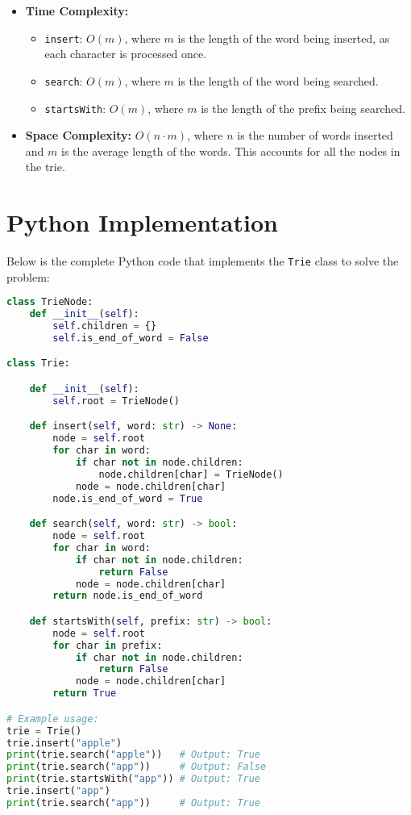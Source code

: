 \begin{itemize}
    \item \textbf{Time Complexity:}
    \begin{itemize}
        \item \texttt{insert}: \(O(m)\), where \(m\) is the length of the word being inserted, as each character is processed once.
        \item \texttt{search}: \(O(m)\), where \(m\) is the length of the word being searched.
        \item \texttt{startsWith}: \(O(m)\), where \(m\) is the length of the prefix being searched.
    \end{itemize}
    \item \textbf{Space Complexity:} \(O(n \cdot m)\), where \(n\) is the number of words inserted and \(m\) is the average length of the words. This accounts for all the nodes in the trie.
\end{itemize}

\section*{Python Implementation}


Below is the complete Python code that implements the \texttt{Trie} class to solve the problem:

\begin{fullwidth}
\begin{lstlisting}[language=Python]
class TrieNode:
    def __init__(self):
        self.children = {}
        self.is_end_of_word = False

class Trie:

    def __init__(self):
        self.root = TrieNode()

    def insert(self, word: str) -> None:
        node = self.root
        for char in word:
            if char not in node.children:
                node.children[char] = TrieNode()
            node = node.children[char]
        node.is_end_of_word = True

    def search(self, word: str) -> bool:
        node = self.root
        for char in word:
            if char not in node.children:
                return False
            node = node.children[char]
        return node.is_end_of_word

    def startsWith(self, prefix: str) -> bool:
        node = self.root
        for char in prefix:
            if char not in node.children:
                return False
            node = node.children[char]
        return True

# Example usage:
trie = Trie()
trie.insert("apple")
print(trie.search("apple"))   # Output: True
print(trie.search("app"))     # Output: False
print(trie.startsWith("app")) # Output: True
trie.insert("app")
print(trie.search("app"))     # Output: True
\end{lstlisting}
\end{fullwidth}

